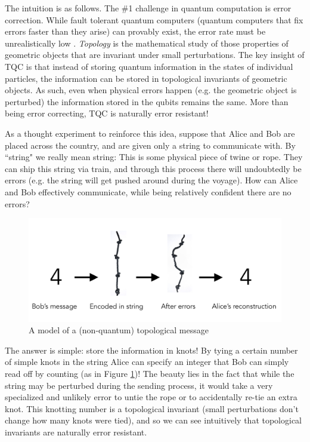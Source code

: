 \documentclass{article}
\theoremstyle{definition}
\numberwithin{figure}{section}
\begin{document}
The intuition is as follows. The $\#$1 challenge in quantum computation is error correction. While fault tolerant quantum computers (quantum computers that fix errors faster than they arise) can provably exist, the error rate must be unrealistically low \cite{gottesman1998theory}. \textit{Topology} is the mathematical study of those properties of geometric objects that are invariant under small perturbations. The key insight of TQC is that instead of storing quantum information in the states of individual particles, the information can be stored in topological invariants of geometric objects. As such, even when physical errors happen (e.g. the geometric object is perturbed) the information stored in the qubits remains the same. More than being error correcting, TQC is naturally error resistant!

As a thought experiment to reinforce this idea, suppose that Alice and Bob are placed across the country, and are given only a string to communicate with. By ``string" we really mean string: This is some physical piece of twine or rope. They can ship this string via train, and through this process there will undoubtedly be errors (e.g. the string will get pushed around during the voyage). How can Alice and Bob effectively communicate, while being relatively confident there are no errors?

\begin{figure}
\begin{center}
\includegraphics[scale=0.25]{rope-deformations}
\caption{A model of a (non-quantum) topological message}
\label{fig:rope-deformations}
\end{center}
\end{figure}

The answer is simple: store the information in knots! By tying a certain number of simple knots in the string Alice can specify an integer that Bob can simply read off by counting (as in Figure \ref{fig:rope-deformations})! The beauty lies in the fact that while the string may be perturbed during the sending process, it would take a very specialized and unlikely error to untie the rope or to accidentally re-tie an extra knot. This knotting number is a topological invariant (small perturbations don't change how many knots were tied), and so we can see intuitively that topological invariants are naturally error resistant.
\end{document}
